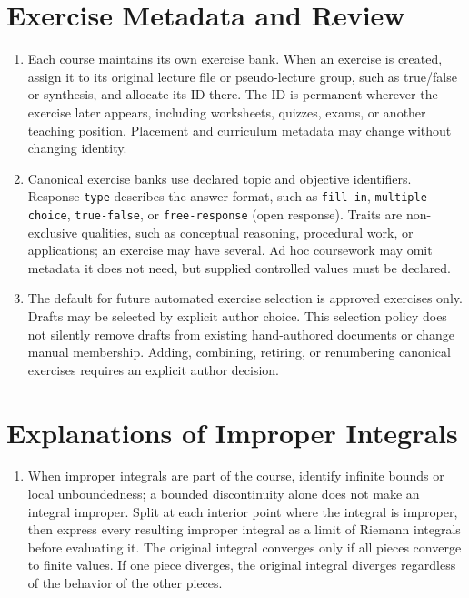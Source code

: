 \documentclass[document,notitlepage]{mhdocument}
\begin{document}
\section{Exercise Metadata and Review}
\begin{enumerate}[resume]
\item Each course maintains its own exercise bank. When an exercise is created, assign it to its original lecture file or pseudo-lecture group, such as true/false or synthesis, and allocate its ID there. The ID is permanent wherever the exercise later appears, including worksheets, quizzes, exams, or another teaching position. Placement and curriculum metadata may change without changing identity.

\item Canonical exercise banks use declared topic and objective identifiers. Response \texttt{type} describes the answer format, such as \texttt{fill-in}, \texttt{multiple-choice}, \texttt{true-false}, or \texttt{free-response} (open response). Traits are non-exclusive qualities, such as conceptual reasoning, procedural work, or applications; an exercise may have several. Ad hoc coursework may omit metadata it does not need, but supplied controlled values must be declared.

\item The default for future automated exercise selection is approved exercises only. Drafts may be selected by explicit author choice. This selection policy does not silently remove drafts from existing hand-authored documents or change manual membership. Adding, combining, retiring, or renumbering canonical exercises requires an explicit author decision.
\end{enumerate}

\section{Explanations of Improper Integrals}
\begin{enumerate}[resume]
\item When improper integrals are part of the course, identify infinite bounds or local unboundedness; a bounded discontinuity alone does not make an integral improper. Split at each interior point where the integral is improper, then express every resulting improper integral as a limit of Riemann integrals before evaluating it. The original integral converges only if all pieces converge to finite values. If one piece diverges, the original integral diverges regardless of the behavior of the other pieces.
\end{enumerate}
\end{document}
